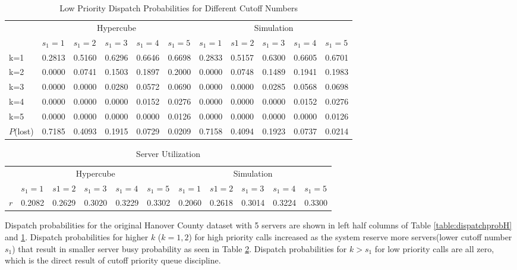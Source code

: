 \documentclass{article}
\begin{document}
\begin{table}
\centering
\begin{tabular}{| l || l l l l l | l l l l l |}
\hline
\hline
& \multicolumn{5}{c|}{Hypercube} & \multicolumn{5}{c|}{Simulation}\\
& $s_1=1$ & $ s_1= 2$ & $s_1=3$ & $s_1=4$ & $s_1=5$& $s_1=1$ & $ s1= 2$ & $s_1=3$ & $s_1=4$ & $s_1=5$  \\ 
\hline
k=1 &0.2813&0.5160&0.6296&0.6646&0.6698&0.2833&0.5157&0.6300&0.6605&0.6701  \\
k=2 &0.0000&0.0741&0.1503&0.1897&0.2000&0.0000&0.0748&0.1489&0.1941&0.1983  \\
k=3 &0.0000&0.0000&0.0280&0.0572&0.0690&0.0000&0.0000&0.0285&0.0568&0.0698  \\
k=4 &0.0000&0.0000&0.0000&0.0152&0.0276&0.0000&0.0000&0.0000&0.0152&0.0276  \\
k=5 &0.0000&0.0000&0.0000&0.0000&0.0126&0.0000&0.0000&0.0000&0.0000&0.0126  \\
\hline
$P$(lost) &0.7185&0.4093&0.1915&0.0729&0.0209&0.7158&0.4094&0.1923&0.0737&0.0214 \\
\hline
\end{tabular}
\label{table:dispatchprobL}
\caption{Low Priority Dispatch Probabilities for Different Cutoff Numbers}
\end{table}

\begin{table}
\centering
\begin{tabular}{| l || l l l l l | l l l l l |}
\hline
& \multicolumn{5}{c|}{Hypercube} & \multicolumn{5}{c|}{Simulation}\\
& $s_1=1$ & $ s1= 2$ & $s_1=3$ & $s_1=4$ & $s_1=5$& $s_1=1$ & $ s1= 2$ & $s_1=3$ & $s_1=4$ & $s_1=5$  \\ 
\hline
$r$   &0.2082&0.2629&0.3020&0.3229&0.3302&0.2060&0.2618&0.3014&0.3224&0.3300  \\
\hline
\end{tabular}
\label{table:queueetc}
\caption{Server Utilization}
\end{table}

Dispatch probabilities for the original Hanover County dataset with 5 servers are shown in left half columns of Table \ref{table:dispatchprobH} and \ref{table:dispatchprobL}. Dispatch probabilities for higher $k$ ($k=1,2$) for high priority calls increased as the system reserve more servers(lower cutoff number $s_1$) that result in smaller server busy probability as seen in Table \ref{table:queueetc}. Dispatch probabilities for $k>s_1$ for low priority calls are all zero, which is the direct result of cutoff priority queue discipline.
\end{document}
